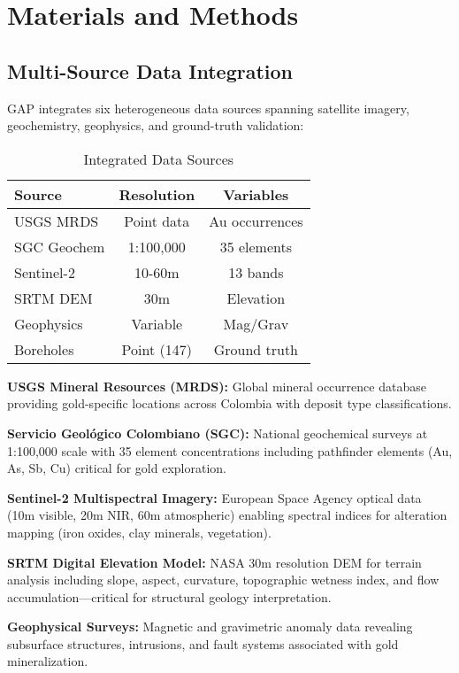 \documentclass[12pt,a4paper]{article}
\begin{document}
\section{Materials and Methods}

\subsection{Multi-Source Data Integration}

GAP integrates six heterogeneous data sources spanning satellite imagery, geochemistry, geophysics, and ground-truth validation:

\begin{table}[h]
\centering
\caption{Integrated Data Sources}
\label{tab:data_sources}
\begin{tabular}{@{}lcc@{}}
\toprule
\textbf{Source} & \textbf{Resolution} & \textbf{Variables} \\
\midrule
USGS MRDS & Point data & Au occurrences \\
SGC Geochem & 1:100,000 & 35 elements \\
Sentinel-2 & 10-60m & 13 bands \\
SRTM DEM & 30m & Elevation \\
Geophysics & Variable & Mag/Grav \\
Boreholes & Point (147) & Ground truth \\
\bottomrule
\end{tabular}
\end{table}

\textbf{USGS Mineral Resources (MRDS):} Global mineral occurrence database providing gold-specific locations across Colombia with deposit type classifications.

\textbf{Servicio Geológico Colombiano (SGC):} National geochemical surveys at 1:100,000 scale with 35 element concentrations including pathfinder elements (Au, As, Sb, Cu) critical for gold exploration.

\textbf{Sentinel-2 Multispectral Imagery:} European Space Agency optical data (10m visible, 20m NIR, 60m atmospheric) enabling spectral indices for alteration mapping (iron oxides, clay minerals, vegetation).

\textbf{SRTM Digital Elevation Model:} NASA 30m resolution DEM for terrain analysis including slope, aspect, curvature, topographic wetness index, and flow accumulation—critical for structural geology interpretation.

\textbf{Geophysical Surveys:} Magnetic and gravimetric anomaly data revealing subsurface structures, intrusions, and fault systems associated with gold mineralization.
\end{document}
